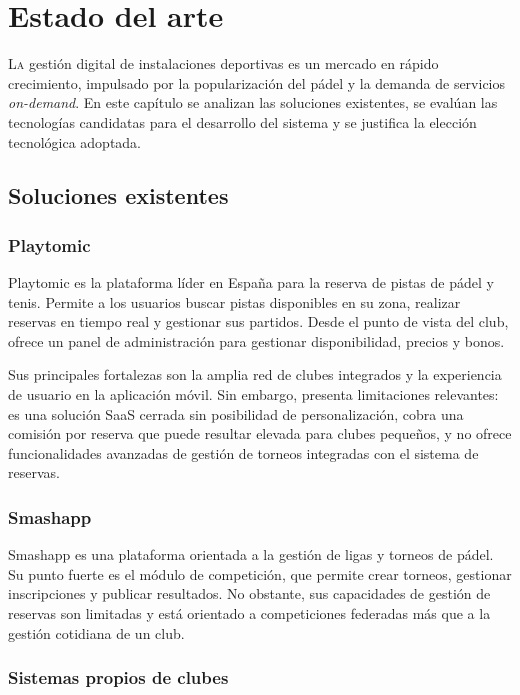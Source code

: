 \chapter{Estado del arte}
\label{chap:estadoarte}

\lettrine{L}{a} gestión digital de instalaciones deportivas es un mercado en
rápido crecimiento, impulsado por la popularización del pádel y la demanda de
servicios \textit{on-demand}. En este capítulo se analizan las soluciones
existentes, se evalúan las tecnologías candidatas para el desarrollo del sistema
y se justifica la elección tecnológica adoptada.

\section{Soluciones existentes}
\label{sec:soluciones_existentes}

\subsection{Playtomic}

Playtomic es la plataforma líder en España para la reserva de pistas de pádel y
tenis. Permite a los usuarios buscar pistas disponibles en su zona, realizar
reservas en tiempo real y gestionar sus partidos. Desde el punto de vista del
club, ofrece un panel de administración para gestionar disponibilidad, precios y
bonos.

Sus principales fortalezas son la amplia red de clubes integrados y la experiencia
de usuario en la aplicación móvil. Sin embargo, presenta limitaciones relevantes:
es una solución SaaS cerrada sin posibilidad de personalización, cobra una
comisión por reserva que puede resultar elevada para clubes pequeños, y no ofrece
funcionalidades avanzadas de gestión de torneos integradas con el sistema de
reservas.

\subsection{Smashapp}

Smashapp es una plataforma orientada a la gestión de ligas y torneos de pádel.
Su punto fuerte es el módulo de competición, que permite crear torneos, gestionar
inscripciones y publicar resultados. No obstante, sus capacidades de gestión de
reservas son limitadas y está orientado a competiciones federadas más que a la
gestión cotidiana de un club.

\subsection{Sistemas propios de clubes}

